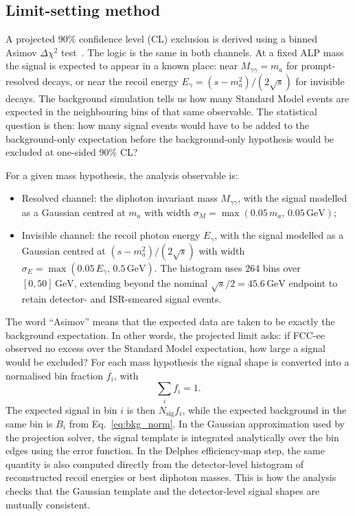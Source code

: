 \documentclass[12pt,a4paper]{article}
\newcommand{\ma}{m_a}
\newcommand{\sqrts}{\sqrt{s}}
\newcommand{\GeV}{\,\text{GeV}}
\newcommand{\dchi}{\Delta\chi^2}
\begin{document}
\subsection{Limit-setting method}

A projected 90\% confidence level (CL) exclusion is derived using a
binned Asimov $\dchi$ test~\cite{Cowan2011}.
The logic is the same in both channels. At a fixed ALP mass the signal is
expected to appear in a known place: near $M_{\gamma\gamma}=m_a$ for
prompt-resolved decays, or near the recoil energy
$E_\gamma=(s-m_a^2)/(2\sqrts)$ for invisible decays. The background simulation
tells us how many Standard Model events are expected in the neighbouring bins
of that same observable. The statistical question is then: how many signal
events would have to be added to the background-only expectation before the
background-only hypothesis would be excluded at one-sided 90\% CL?

For a given mass hypothesis, the analysis observable is:
\begin{itemize}
    \item Resolved channel: the diphoton invariant mass $M_{\gamma\gamma}$,
    with the signal modelled as a Gaussian centred at $\ma$ with width
    $\sigma_M = \max(0.05\,\ma,\, 0.05\GeV)$;
    \item Invisible channel: the recoil photon energy $E_\gamma$,
    with the signal modelled as a Gaussian centred at $(s-\ma^2)/(2\sqrts)$
    with width $\sigma_E = \max(0.05\,E_\gamma,\, 0.5\GeV)$.
	    The histogram uses 264 bins over $[0, 50]\GeV$, extending beyond
	    the nominal $\sqrts/2 = 45.6\GeV$ endpoint to retain
	    detector- and ISR-smeared signal events.
\end{itemize}

The word ``Asimov'' means that the expected data are taken to be exactly the
background expectation. In other words, the projected limit asks: if FCC-ee
observed no excess over the Standard Model expectation, how large a signal
would be excluded? For each mass hypothesis the signal shape is converted into
a normalised bin fraction $f_i$, with
\begin{equation}
    \sum_i f_i = 1.
\end{equation}
The expected signal in bin $i$ is then $N_\mathrm{sig}f_i$, while the expected
background in the same bin is $B_i$ from Eq.~\eqref{eq:bkg_norm}. In the
Gaussian approximation used by the projection solver, the signal template is
integrated analytically over the bin edges using the error function. In the
Delphes efficiency-map step, the same quantity is also computed directly from
the detector-level histogram of reconstructed recoil energies or best diphoton
masses. This is how the analysis checks that the Gaussian template and the
detector-level signal shapes are mutually consistent.
\end{document}
